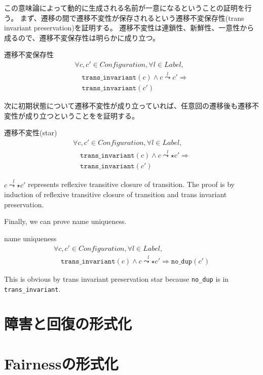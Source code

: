 この意味論によって動的に生成される名前が一意になるということの証明を行う。
まず、遷移の間で遷移不変性が保存されるという遷移不変保存性(trans invariant preservation)を証明する。
遷移不変性は連鎖性、新鮮性、一意性から成るので、遷移不変保存性は明らかに成り立つ。

\begin{lemma}{遷移不変保存性}
  \begin{displaymath}
    \begin{array}{l}
      \forall c, c' \in \textit{Configuration}, \forall l \in \textit{Label}, \\
      \quad \texttt{trans\_invariant}(c) \wedge c \overset{l}{\leadsto} c' \Rightarrow \\
      \quad \texttt{trans\_invariant}(c')
    \end{array}
  \end{displaymath}
\end{lemma}

次に初期状態について遷移不変性が成り立っていれば、任意回の遷移後も遷移不変性が成り立つということをを証明する。

\begin{lemma}{遷移不変性(star)}
  \begin{displaymath}
    \begin{array}{l}
      \forall c, c' \in \textit{Configuration}, \forall l \in \textit{Label}, \\
      \quad \texttt{trans\_invariant}(c) \wedge c \overset{l}{\leadsto\star} c' \Rightarrow \\
      \quad \texttt{trans\_invariant}(c')
    \end{array}
  \end{displaymath}
\end{lemma}

$c \overset{l}{\leadsto\star} c'$ represents reflexive transitive closure of transition.
The proof is by induction of reflexive transitive closure of transition and trans invariant preservation.

Finally, we can prove name uniqueness.
\begin{theorem}{name uniqueness}
  \begin{displaymath}
    \begin{array}{l}
      \forall c, c' \in \textit{Configuration}, \forall l \in \textit{Label}, \\
      \quad \texttt{trans\_invariant}(c) \wedge c \overset{l}{\leadsto\star} c' \Rightarrow \texttt{no\_dup}(c')
    \end{array}
  \end{displaymath}
\end{theorem}
This is obvious by trans invariant preservation star because \texttt{no\_dup} is in \texttt{trans\_invariant}.


\section{障害と回復の形式化}

\section{Fairnessの形式化}
